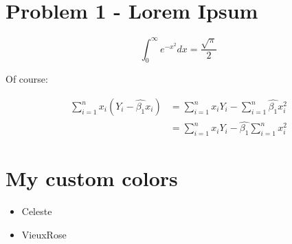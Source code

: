 \documentclass{mcgillhomework}
\begin{document}
\createtitlepage

\pagestyle{mainmatter}

\section{Problem 1 - Lorem Ipsum}

\lipsum[66]

$$\int_0^\infty e^{-x^2} dx=\frac{\sqrt{\pi}}{2}$$ 

Of course:

\[
    \begin{split}
        \sum_{i = 1}^{n} {x_i (Y_i - \hat{\beta_1} x_i)}
        &= \sum_{i = 1}^{n} {x_i Y_i}
        - \sum_{i = 1}^{n} \hat{\beta_1} x_i^2
        \\
        &= \sum_{i = 1}^{n} {x_i Y_i}
        - \hat{\beta_1}\sum_{i = 1}^{n} x_i^2
    \end{split}
\]

\lipsum[73]

\clearpage

\section{My custom colors}

\begin{itemize}
    \item \colorbox{Celeste}{Celeste}
    \item \colorbox{VieuxRose}{VieuxRose}
\end{itemize}
\end{document}
